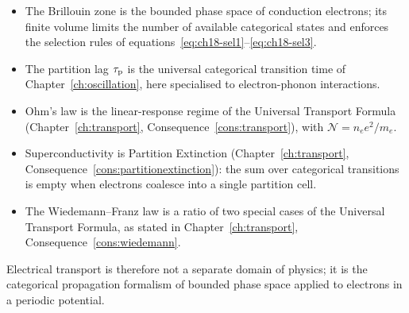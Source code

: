 \begin{itemize}
  \item The Brillouin zone is the bounded phase space of conduction
    electrons; its finite volume limits the number of available categorical
    states and enforces the selection rules of
    equations~\eqref{eq:ch18-sel1}--\eqref{eq:ch18-sel3}.

  \item The partition lag $\tau_{\mathrm{p}}$ is the universal categorical transition
    time of Chapter~\ref{ch:oscillation}, here specialised to
    electron-phonon interactions.

  \item Ohm's law is the linear-response regime of the Universal Transport
    Formula (Chapter~\ref{ch:transport}, Consequence~\ref{cons:transport}),
    with $\mathcal{N} = n_e e^2/m_e$.

  \item Superconductivity is Partition Extinction
    (Chapter~\ref{ch:transport}, Consequence~\ref{cons:partitionextinction}):
    the sum over categorical transitions is empty when electrons coalesce
    into a single partition cell.

  \item The Wiedemann--Franz law is a ratio of two special cases of the
    Universal Transport Formula, as stated in
    Chapter~\ref{ch:transport}, Consequence~\ref{cons:wiedemann}.
\end{itemize}

Electrical transport is therefore not a separate domain of physics; it is
the categorical propagation formalism of bounded phase space applied to
electrons in a periodic potential.

